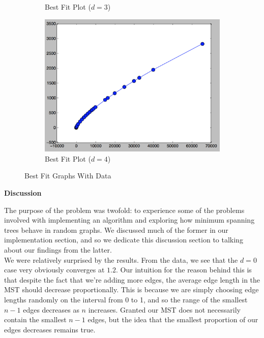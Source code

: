 \documentclass[12pt]{article}
\begin{document}
\begin{figure}[h!]
\begin{subfigure}{.5\textwidth}
  \caption{Best Fit Plot ($d = 3$)}
  \label{fig:sub3}
\end{subfigure}%
\begin{subfigure}{.5\textwidth}
  \centering
  \includegraphics[width=0.8\linewidth]{img/d4_fit.png}
  \caption{Best Fit Plot ($d = 4$)}
  \label{fig:sub4}
\end{subfigure}%
\caption{Best Fit Graphs With Data}
\end{figure}

\pagebreak

\textbf{Discussion}

The purpose of the problem was twofold: to experience some of the problems involved with implementing an algorithm and exploring how minimum spanning trees behave in random graphs. We discussed much of the former in our implementation section, and so we dedicate this discussion section to talking about our findings from the latter. \\

We were relatively surprised by the results. From the data, we see that the $d = 0$ case very obviously converges at $1.2$. Our intuition for the reason behind this is that despite the fact that we're adding more edges, the average edge length in the MST should decrease proportionally. This is because we are simply choosing edge lengths randomly on the interval from 0 to 1, and so the range of the smallest $n - 1$ edges decreases as $n$ increases. Granted our MST does not necessarily contain the smallest $n - 1$ edges, but the idea that the smallest proportion of our edges decreases remains true. \\
\end{document}
